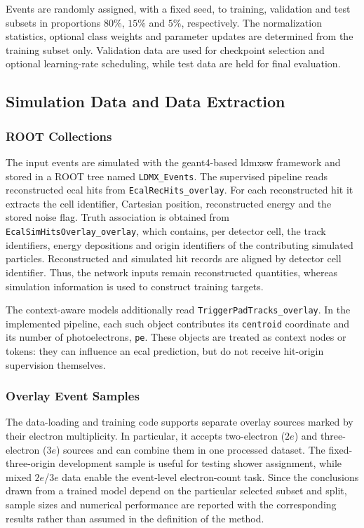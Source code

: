 Events are randomly assigned, with a fixed seed, to training, validation and
test subsets in proportions \(80\%\), \(15\%\) and \(5\%\), respectively.
The normalization statistics, optional class weights and parameter updates
are determined from the training subset only. Validation data are used for
checkpoint selection and optional learning-rate scheduling, while test data
are held for final evaluation.

\subsection{Simulation Data and Data Extraction}


\subsubsection{ROOT Collections}



The input events are simulated with the \gls{geant4}-based \gls{ldmxsw}
framework and stored in a ROOT tree named \texttt{LDMX\_Events}. The
supervised pipeline reads reconstructed \gls{ecal} hits from
\texttt{EcalRecHits\_overlay}. For each reconstructed hit it extracts the
cell identifier, Cartesian position, reconstructed energy and the stored
noise flag. Truth association is obtained from
\texttt{EcalSimHitsOverlay\_overlay}, which contains, per detector cell, the
track identifiers, energy depositions and origin identifiers of the
contributing simulated particles. Reconstructed and simulated hit records are
aligned by detector cell identifier. Thus, the network inputs remain
reconstructed quantities, whereas simulation information is used to construct
training targets.

The context-aware models additionally read
\texttt{TriggerPadTracks\_overlay}. In the implemented pipeline, each such
object contributes its \texttt{centroid} coordinate and its number of
photoelectrons, \texttt{pe}. These objects are treated as context nodes or
tokens: they can influence an \gls{ecal} prediction, but do not receive
hit-origin supervision themselves.

\subsubsection{Overlay Event Samples}

The data-loading and training code supports separate overlay sources marked
by their electron multiplicity. In particular, it accepts two-electron
(\(2e\)) and three-electron (\(3e\)) sources and can combine them in one
processed dataset. The fixed-three-origin development sample is useful for
testing shower assignment, while mixed \(2e\)/\(3e\) data enable the event-level
electron-count task. Since the conclusions drawn from a trained model depend
on the particular selected subset and split, sample sizes and numerical
performance are reported with the corresponding results rather than assumed
in the definition of the method.


